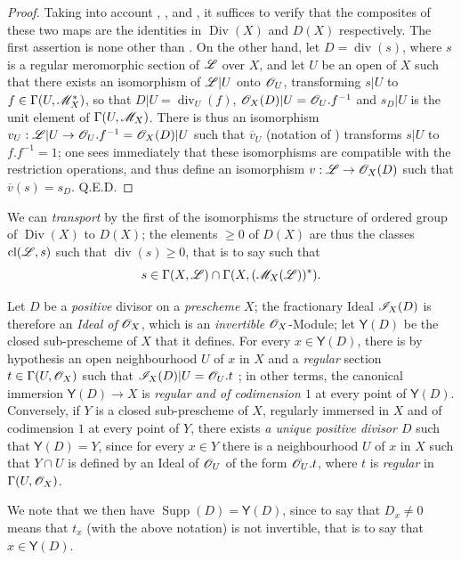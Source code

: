 \begin{proof}
Taking into account , , and , it suffices to verify that the composites of these two maps are the identities in $\operatorname{Div}(X)$ and $D(X)$ respectively.
The first assertion is none other than .
On the other hand, let $D=\operatorname{div}(s)$, where $s$ is a regular meromorphic section of $\mathscr{L}$ over $X$, and let $U$ be an open of $X$ such that there exists an isomorphism of $\mathscr{L}|U$ onto $\mathscr{O}_U$, transforming $s|U$ to $f\in\Gamma(U,\mathscr{M}_X^*)$, so that $D|U=\operatorname{div}_U(f)$, $\mathscr{O}_X(D)|U=\mathscr{O}_U.f^{-1}$ and $s_D|U$ is the unit element of $\Gamma(U,\mathscr{M}_X)$.
There is thus an isomorphism $v_U:\mathscr{L}|U\to\mathscr{O}_U.f^{-1}=\mathscr{O}_X(D)|U$ such that $\overline{v}_U$ (notation of ) transforms $s|U$ to $f.f^{-1}=1$;
one sees immediately that these isomorphisms are compatible with the restriction operations, and thus define an isomorphism $v:\mathscr{L}\to\mathscr{O}_X(D)$ such that $\overline{v}(s)=s_D$. Q.E.D.
\end{proof}

We can \emph{transport} by the first of the isomorphisms  the structure of ordered group of $\operatorname{Div}(X)$ to $D(X)$;
the elements $\geq 0$ of $D(X)$ are thus the classes $\operatorname{cl}(\mathscr{L},s)$ such that $\operatorname{div}(s)\geq 0$, that is to say  such that
\[
  s\in\Gamma(X,\mathscr{L})\cap\Gamma(X,(\mathscr{M}_X(\mathscr{L}))^*).
\]

\begin{env}[21.2.12]
\label{IV.21.2.12}
Let $D$ be a \emph{positive} divisor on a \emph{prescheme} $X$;
the fractionary Ideal $\mathscr{I}_X(D)$ is therefore an \emph{Ideal of} $\mathscr{O}_X$, which is an \emph{invertible} $\mathscr{O}_X$-Module;
let $\boldsymbol{\mathsf{Y}}(D)$ be the closed sub-prescheme of $X$ that it defines.
For every $x\in\boldsymbol{\mathsf{Y}}(D)$, there is by hypothesis an open neighbourhood $U$ of $x$ in $X$ and a \emph{regular} section $t\in\Gamma(U,\mathscr{O}_X)$ such that $\mathscr{I}_X(D)|U=\mathscr{O}_U.t$ ;
in other terms, the canonical immersion $\boldsymbol{\mathsf{Y}}(D)\to X$ is \emph{regular and of codimension $1$}  at every point of $\boldsymbol{\mathsf{Y}}(D)$.
Conversely, if $Y$ is a closed sub-prescheme of $X$, regularly immersed in $X$ and of codimension $1$ at every point of $Y$, there exists \emph{a unique positive divisor $D$} such that $\boldsymbol{\mathsf{Y}}(D)=Y$, since for every $x\in Y$ there is a neighbourhood $U$ of $x$ in $X$ such that $Y\cap U$ is defined by an Ideal of $\mathscr{O}_U$ of the form $\mathscr{O}_U.t$, where $t$ is \emph{regular} in $\Gamma(U,\mathscr{O}_X)$.

We note that we then have $\operatorname{Supp}(D)=\boldsymbol{\mathsf{Y}}(D)$, since to say that $D_x\neq 0$ means that $t_x$ (with the above notation) is not invertible, that is to say that $x\in\boldsymbol{\mathsf{Y}}(D)$.
\end{env}

